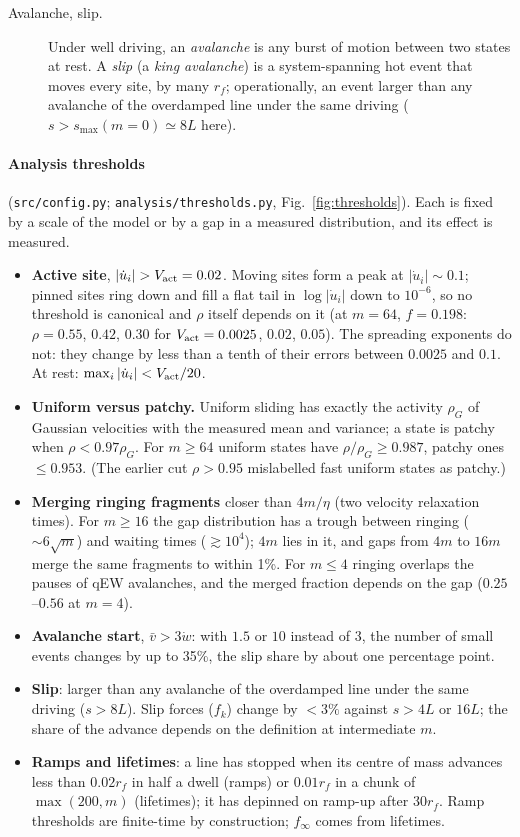 \documentclass[10pt,a4paper]{article}
\begin{document}
\begin{description}
\item[Avalanche, slip.] Under well driving, an \emph{avalanche} is any burst of motion between two states at rest. A \emph{slip} (a \emph{king avalanche}) is a system-spanning hot event that moves every site, by many $r_f$; operationally, an event larger than any avalanche of the overdamped line under the same driving ($s>s_{\max}(m=0)\simeq8L$ here).
\end{description}

\paragraph{Analysis thresholds} (\texttt{src/config.py}; \texttt{analysis/thresholds.py}, Fig.~\ref{fig:thresholds}). Each is fixed by a scale of the model or by a gap in a measured distribution, and its effect is measured.
\begin{itemize}
\item \textbf{Active site}, $|\dot u_i|>V_{\rm act}=0.02$. Moving sites form a peak at $|\dot u_i|\sim0.1$; pinned sites ring down and fill a flat tail in $\log|\dot u_i|$ down to $10^{-6}$, so no threshold is canonical and $\rho$ itself depends on it (at $m=64$, $f=0.198$: $\rho=0.55$, $0.42$, $0.30$ for $V_{\rm act}=0.0025$, $0.02$, $0.05$). The spreading exponents do not: they change by less than a tenth of their errors between $0.0025$ and $0.1$. At rest: $\max_i|\dot u_i|<V_{\rm act}/20$.
\item \textbf{Uniform versus patchy.} Uniform sliding has exactly the activity $\rho_G$ of Gaussian velocities with the measured mean and variance; a state is patchy when $\rho<0.97\rho_G$. For $m\ge64$ uniform states have $\rho/\rho_G\ge0.987$, patchy ones $\le0.953$. (The earlier cut $\rho>0.95$ mislabelled fast uniform states as patchy.)
\item \textbf{Merging ringing fragments} closer than $4m/\eta$ (two velocity relaxation times). For $m\ge16$ the gap distribution has a trough between ringing ($\sim6\sqrt m$) and waiting times ($\gtrsim10^4$); $4m$ lies in it, and gaps from $4m$ to $16m$ merge the same fragments to within 1\%. For $m\le4$ ringing overlaps the pauses of qEW avalanches, and the merged fraction depends on the gap ($0.25$--$0.56$ at $m=4$).
\item \textbf{Avalanche start}, $\bar v>3\dot w$: with $1.5$ or $10$ instead of $3$, the number of small events changes by up to 35\%, the slip share by about one percentage point.
\item \textbf{Slip}: larger than any avalanche of the overdamped line under the same driving ($s>8L$). Slip forces ($f_k$) change by $<3\%$ against $s>4L$ or $16L$; the share of the advance depends on the definition at intermediate $m$.
\item \textbf{Ramps and lifetimes}: a line has stopped when its centre of mass advances less than $0.02r_f$ in half a dwell (ramps) or $0.01r_f$ in a chunk of $\max(200,m)$ (lifetimes); it has depinned on ramp-up after $30r_f$. Ramp thresholds are finite-time by construction; $f_\infty$ comes from lifetimes.
\end{itemize}
\end{document}
